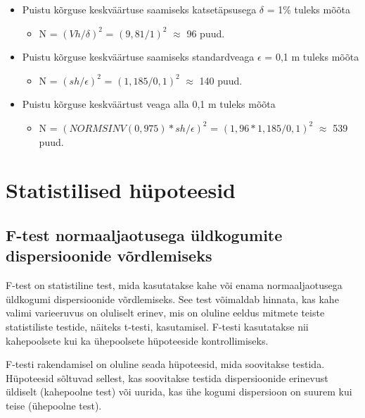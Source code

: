 \documentclass[
]{book}
\providecommand{\tightlist}{%
  \setlength{\itemsep}{0pt}\setlength{\parskip}{0pt}}
\begin{document}
\begin{itemize}
\tightlist
\item
  Puistu kõrguse keskväärtuse saamiseks katsetäpsusega \(\delta\) = 1\% tuleks mõõta

  \begin{itemize}
  \tightlist
  \item
    N = \((Vh/\delta)^2\) = \((9,81/1)^2\) \(\approx\) 96 puud.
  \end{itemize}
\item
  Puistu kõrguse keskväärtuse saamiseks standardveaga \(\epsilon\) = 0,1 m tuleks mõõta

  \begin{itemize}
  \tightlist
  \item
    N = \((sh/\epsilon)^2\) = \((1,185/0,1)^2\) \(\approx\) 140 puud.
  \end{itemize}
\item
  Puistu kõrguse keskväärtust veaga alla 0,1 m tuleks mõõta

  \begin{itemize}
  \tightlist
  \item
    N = \((NORMSINV(0,975)*sh/\epsilon)^2\) = \((1,96 * 1,185/0,1)^2\) \(\approx\) 539 puud.
  \end{itemize}
\end{itemize}

\section{Statistilised hüpoteesid}\label{statistilised-huxfcpoteesid}

\subsection{F-test normaaljaotusega üldkogumite dispersioonide võrdlemiseks}\label{f-test-normaaljaotusega-uxfcldkogumite-dispersioonide-vuxf5rdlemiseks}

F-test on statistiline test, mida kasutatakse kahe või enama normaaljaotusega üldkogumi dispersioonide võrdlemiseks. See test võimaldab hinnata, kas kahe valimi varieeruvus on oluliselt erinev, mis on oluline eeldus mitmete teiste statistiliste testide, näiteks t-testi, kasutamisel. F-testi kasutatakse nii kahepoolsete kui ka ühepoolsete hüpoteeside kontrollimiseks.

F-testi rakendamisel on oluline seada hüpoteesid, mida soovitakse testida. Hüpoteesid sõltuvad sellest, kas soovitakse testida dispersioonide erinevust üldiselt (kahepoolne test) või uurida, kas ühe kogumi dispersioon on suurem kui teise (ühepoolne test).
\end{document}
